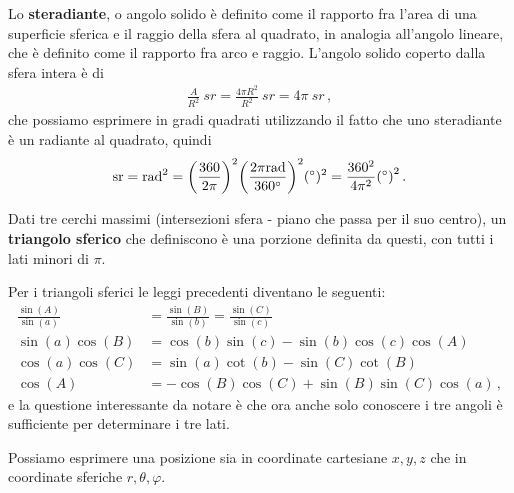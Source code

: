 \documentclass[main.tex]{subfiles}
\begin{document}
Lo \textbf{steradiante}, o angolo solido è definito come il rapporto fra l'area di una superficie sferica e il raggio della sfera al quadrato, in analogia all'angolo lineare, che è definito come il rapporto fra arco e raggio. L'angolo solido coperto dalla sfera intera è di 
%
\begin{align}
\frac{A}{R^2} \SI{}{sr} = \frac{4 \pi R^2}{R^2} \SI{}{sr} = 4 \pi \SI{}{sr} 
\,,
\end{align}
%
che possiamo esprimere in gradi quadrati utilizzando il fatto che uno steradiante è un radiante al quadrato, quindi 
%
\begin{align}
\SI{}{sr} = \SI{}{rad}^2 = \qty( \frac{360}{2 \pi } )^2 \qty(\frac{2 \pi \SI{}{rad}}{\SI{360}{\degree}})^2 (\SI{}{\degree})^2 
= \frac{360^2}{4 \pi^2} \qty(\SI{}{\degree})^2
\,.
\end{align}

Dati tre cerchi massimi (intersezioni sfera - piano che passa per il suo centro), un \textbf{triangolo sferico} che definiscono è una porzione definita da questi, con tutti i lati minori di \(\pi \). 

Per i triangoli sferici le leggi precedenti diventano le seguenti: 
%
\begin{align}
\frac{\sin(A)}{\sin(a)} &=
\frac{\sin(B)}{\sin(b)} =
\frac{\sin(C)}{\sin(c)}   \\
\sin(a) \cos(B) &= \cos(b) \sin(c) - \sin(b) \cos(c) \cos(A)  \\
\cos(a) \cos(C) &= \sin(a) \cot(b) - \sin(C) \cot(B)  \\
\cos(A) &= - \cos(B) \cos(C) + \sin(B) \sin(C) \cos(a)
\,,
\end{align}
%
e la questione interessante da notare è che ora anche solo conoscere i tre angoli è sufficiente per determinare i tre lati.

Possiamo esprimere una posizione sia in coordinate cartesiane \(x, y, z\) che in coordinate sferiche \(r , \theta , \varphi \). 
\end{document}
